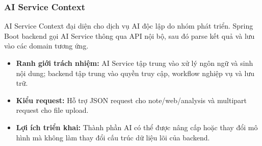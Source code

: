 \subsubsection{AI Service Context}
\label{subsubsec:ai-service-context}

AI Service Context đại diện cho dịch vụ AI độc lập do nhóm phát triển. Spring Boot backend gọi AI Service thông qua API nội bộ, sau đó parse kết quả và lưu vào các domain tương ứng.

\begin{itemize}
    \item \textbf{Ranh giới trách nhiệm:} AI Service tập trung vào xử lý ngôn ngữ và sinh nội dung; backend tập trung vào quyền truy cập, workflow nghiệp vụ và lưu trữ.
    \item \textbf{Kiểu request:} Hỗ trợ JSON request cho note/web/analysis và multipart request cho file upload.
    \item \textbf{Lợi ích triển khai:} Thành phần AI có thể được nâng cấp hoặc thay đổi mô hình mà không làm thay đổi cấu trúc dữ liệu lõi của backend.
\end{itemize}